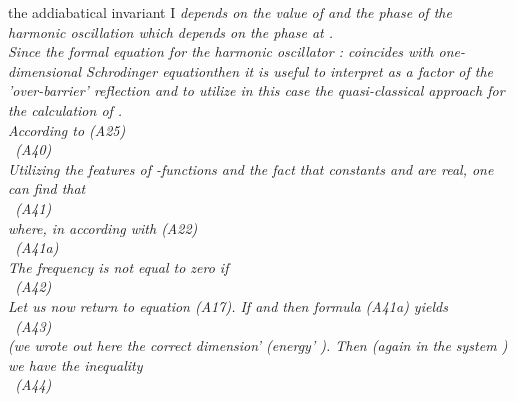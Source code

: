 \documentclass[a4paper,12pt] {article}
\begin{document}
the addiabatical invariant \rm  I \it  depends on the value of \rm  \myHighlight{$ \rho $}\coordHE{}  \it and the  phase
\myHighlight{$\phi $}\coordHE{} \it of the harmonic oscillation which depends on the  phase \rm  \myHighlight{$\delta$}\coordHE{}
\it at \rm   {}\coordHE{}. \\ Since the formal equation for the harmonic oscillator
 : \coordHE{}  coincides with  \it one-dimensional Schrodinger equation\rm  then it is
 useful to interpret \myHighlight{$\rho $}\coordHE{} as a \it  factor of the 'over-barrier' reflection \rm  and to utilize in this case {\it the quasi-classical approach}
for the calculation of \myHighlight{$\rho $}\coordHE{}.\\ According to (A25)
\\\coordHE{} \ (A40)
\\ Utilizing the features of \myHighlight{$\Gamma $}\coordHE{}-functions and the fact that  constants
 \myHighlight{$\omega _+ ,\omega _ -$}\coordHE{} and \coordHE{} are real, one can find that \\ \coordHE{} \ (A41)
\\ where, in according with (A22)\\ \coordHE{}
 \ (A41a) \\ The frequency \coordHE{} is not equal to zero if \\\coordHE{}
 \ (A42) \\  Let us now return to equation (A17). If \coordHE{} and
 \coordHE{} then formula (A41a) yields
\\\coordHE{}
\ (A43)
\\ (we wrote out here the correct dimension' (\it  energy' \rm  ). Then (again in the system \coordHE{}) we
have the inequality \\\coordHE{} \ (A44)
\end{document}

